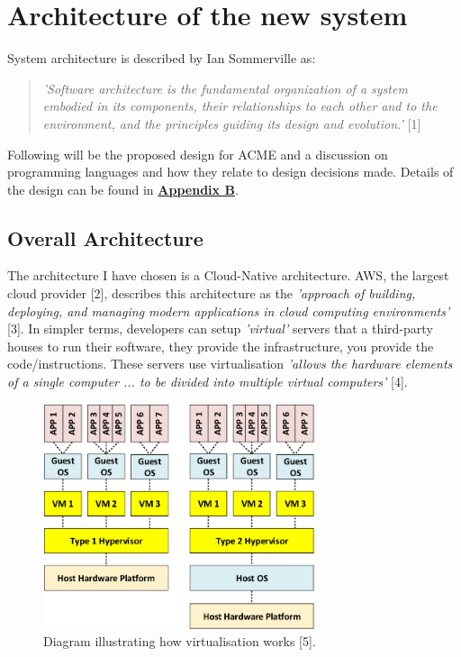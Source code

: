 \section{Architecture of the new system}
  System architecture is described by Ian Sommerville as:
  \begin{quote}
    \textit{'Software architecture is the fundamental organization of a system embodied in its
    components, their relationships to each other and to the environment, and the principles
    guiding its design and evolution.'} [1]
  \end{quote}

  Following will be the proposed design for ACME and a discussion on programming languages and how they relate to design decisions made. 
  Details of the design can be found in \hyperref[sec:AppendixB]{\textbf{Appendix B}}.

  \subsection{Overall Architecture}
  The architecture I have chosen is a Cloud-Native architecture. AWS, the largest cloud provider [2], describes this architecture as the 
  \textit{'approach of building, deploying, and managing modern applications in cloud computing environments'} [3]. In simpler terms, developers can setup
  \textit{'virtual'} servers that a third-party houses to run their software, they provide the infrastructure, you provide the code/instructions. 
  These servers use virtualisation \textit{'allows the hardware elements of a single computer ... to be divided into multiple virtual computers'} [4]. 

  \begin{figure}[H]
    \centering
    \includegraphics[width=8cm]{assets/virtualisation.png}
    \caption{Diagram illustrating how virtualisation works [5].}
    \label{fig:virtualisation}
  \end{figure}

